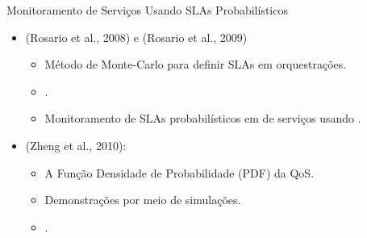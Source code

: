 \documentclass[xcolor=svgnames]{beamer}
\begin{document}
  \begin{frame}{ Monitoramento de Serviços Usando SLAs Probabilísticos}
      \begin{itemize}
	\item <1-> (Rosario et al., 2008) e (Rosario et al., 2009)
	    \begin{itemize}
	      \item Método de Monte-Carlo para definir SLAs em orquestrações.
	      \item \color{red}{Foco no tempo de resposta}.
	      \item Monitoramento de SLAs probabilísticos em \color{red}{orquestrações} de serviços usando \color{red}{Orc}.
	    \end{itemize}
	
	\item <2-> (Zheng et al., 2010):
	    \begin{itemize}
	      \item A Função Densidade de Probabilidade (PDF) da QoS. %
	      \item Demonstrações por meio de simulações.
	      \item \color{red}{Foco no tempo de resposta e não trata SLAs}.
	    \end{itemize}
      \end{itemize}

   \end{frame}


%	
\end{document}
